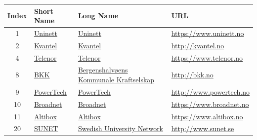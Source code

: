 \begin{small}
\begin{center}
\begin{longtable}{|c|c|c|c|}
 \hline
 Index & \multicolumn{1}{|l|}{Short Name} & \multicolumn{1}{|l|}{Long Name} & \multicolumn{1}{|l|}{URL} \\ \hline
 1 & \multicolumn{1}{|l|}{\index{Uninett}\index{Provider!Uninett}\href{https://www.uninett.no}{Uninett}} & \multicolumn{1}{|l|}{\index{Uninett}\href{https://www.uninett.no}{Uninett}} & \multicolumn{1}{|l|}{\tiny{\url{https://www.uninett.no}}} \\ \hline
 2 & \multicolumn{1}{|l|}{\index{Kvantel}\index{Provider!Kvantel}\href{http://kvantel.no}{Kvantel}} & \multicolumn{1}{|l|}{\index{Kvantel}\href{http://kvantel.no}{Kvantel}} & \multicolumn{1}{|l|}{\tiny{\url{http://kvantel.no}}} \\ \hline
 4 & \multicolumn{1}{|l|}{\index{Telenor}\index{Provider!Telenor}\href{https://www.telenor.no}{Telenor}} & \multicolumn{1}{|l|}{\index{Telenor}\href{https://www.telenor.no}{Telenor}} & \multicolumn{1}{|l|}{\tiny{\url{https://www.telenor.no}}} \\ \hline
 8 & \multicolumn{1}{|l|}{\index{BKK|see{Bergenshalvøens Kommunale Kraftselskap}}\index{Provider!Bergenshalvøens Kommunale Kraftselskap}\href{http://bkk.no}{BKK}} & \multicolumn{1}{|l|}{\index{Bergenshalvøens Kommunale Kraftselskap}\href{http://bkk.no}{Bergenshalvøens Kommunale Kraftselskap}} & \multicolumn{1}{|l|}{\tiny{\url{http://bkk.no}}} \\ \hline
 9 & \multicolumn{1}{|l|}{\index{PowerTech}\index{Provider!PowerTech}\href{http://www.powertech.no}{PowerTech}} & \multicolumn{1}{|l|}{\index{PowerTech}\href{http://www.powertech.no}{PowerTech}} & \multicolumn{1}{|l|}{\tiny{\url{http://www.powertech.no}}} \\ \hline
 10 & \multicolumn{1}{|l|}{\index{Broadnet}\index{Provider!Broadnet}\href{https://www.broadnet.no}{Broadnet}} & \multicolumn{1}{|l|}{\index{Broadnet}\href{https://www.broadnet.no}{Broadnet}} & \multicolumn{1}{|l|}{\tiny{\url{https://www.broadnet.no}}} \\ \hline
 11 & \multicolumn{1}{|l|}{\index{Altibox}\index{Provider!Altibox}\href{https://www.altibox.no}{Altibox}} & \multicolumn{1}{|l|}{\index{Altibox}\href{https://www.altibox.no}{Altibox}} & \multicolumn{1}{|l|}{\tiny{\url{https://www.altibox.no}}} \\ \hline
 20 & \multicolumn{1}{|l|}{\index{SUNET|see{Swedish University Network}}\index{Provider!Swedish University Network}\href{http://www.sunet.se}{SUNET}} & \multicolumn{1}{|l|}{\index{Swedish University Network}\href{http://www.sunet.se}{Swedish University Network}} & \multicolumn{1}{|l|}{\tiny{\url{http://www.sunet.se}}} \\ \hline

\end{longtable}
\end{center}
\end{small}
